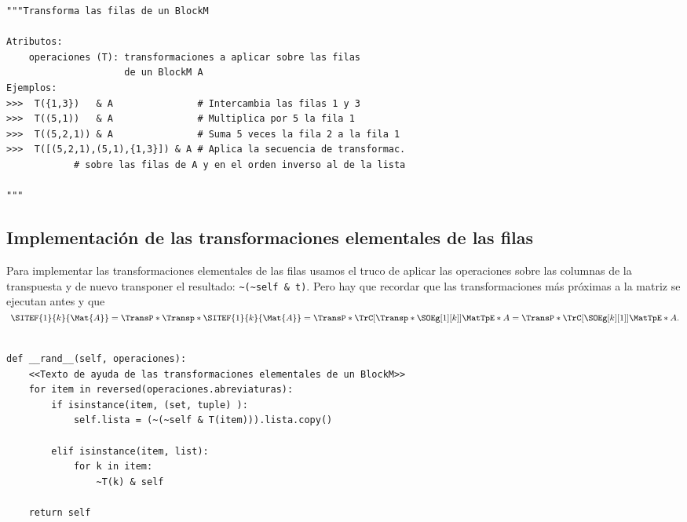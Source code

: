 \documentclass[11pt]{report}
\begin{document}
\begin{verbatim}
"""Transforma las filas de un BlockM

Atributos:
    operaciones (T): transformaciones a aplicar sobre las filas
                     de un BlockM A
Ejemplos:
>>>  T({1,3})   & A               # Intercambia las filas 1 y 3
>>>  T((5,1))   & A               # Multiplica por 5 la fila 1
>>>  T((5,2,1)) & A               # Suma 5 veces la fila 2 a la fila 1
>>>  T([(5,2,1),(5,1),{1,3}]) & A # Aplica la secuencia de transformac.
            # sobre las filas de A y en el orden inverso al de la lista

"""
\end{verbatim}

\subsection{Implementación de las transformaciones elementales de las filas}
\label{sec:org23ddc74}

Para implementar las transformaciones elementales de las filas usamos
el truco de aplicar las operaciones sobre las columnas de la
transpuesta y de nuevo transponer el resultado: \texttt{\textasciitilde{}(\textasciitilde{}self \& t)}.  Pero
hay que recordar que las transformaciones más próximas a la matriz se
ejecutan antes y que
\begin{math}
  \;\SITEF{1}{k}{\Mat{A}}=
  \TransP*{\Transp*{\SITEF{1}{k}{\Mat{A}}}}=
  \TransP*{\TrC[\Transp*{\SOEg[1][k]}]{\MatTpE*{A}}}=
  \TransP*{\TrC[\SOEg[k][1]]{\MatTpE*{A}}}.
\end{math}

\begin{verbatim}

def __rand__(self, operaciones):
    <<Texto de ayuda de las transformaciones elementales de un BlockM>>
    for item in reversed(operaciones.abreviaturas):
        if isinstance(item, (set, tuple) ):
            self.lista = (~(~self & T(item))).lista.copy()
    
        elif isinstance(item, list):
            for k in item:          
                ~T(k) & self
    
    return self 

\end{verbatim}
\end{document}
